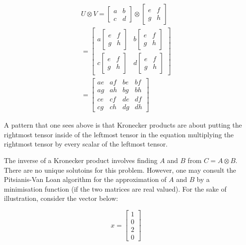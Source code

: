 \documentclass[../main.tex]{subfiles}
\begin{document}
\begin{gather*}
    U \otimes V = \begin{bmatrix} a & b \\ c & d  \end{bmatrix} \otimes \begin{bmatrix} e & f \\ g & h  \end{bmatrix} \\
    = \begin{bmatrix} a \begin{bmatrix} e & f \\ g & h  \end{bmatrix}
        & b \begin{bmatrix} e & f \\ g & h  \end{bmatrix}\\ 
        c \begin{bmatrix} e & f \\ g & h  \end{bmatrix}
        & d \begin{bmatrix} e & f \\ g & h  \end{bmatrix} \end{bmatrix} \\
        =  \begin{bmatrix} ae & af & be & bf \\ ag & ah & bg & bh \\ ce & cf & de & df \\ cg & ch & dg & dh  \end{bmatrix}
    \label{eq: kronecker_matrix}
\end{gather*}

A pattern that one sees above is that Kronecker products are about putting the rightmost tensor inside of the leftmost tensor in the equation multiplying the rightmost tensor by every scalar of the leftmost tensor.  

The inverse of a Kronecker product involves finding $A$ and $B$ from $C = A \otimes B$. There are no unique solutoins for this problem. However, one may consult the Pitsianis-Van Loan algorithm for the approximation of $A$ and $B$ by a minimisation function (if the two matrices are real valued). For the sake of illustration, consider the vector below:

\begin{equation*}
    x = \begin{bmatrix} 1 \\ 0 \\ 2 \\ 0  \end{bmatrix}
\end{equation*}
\end{document}
